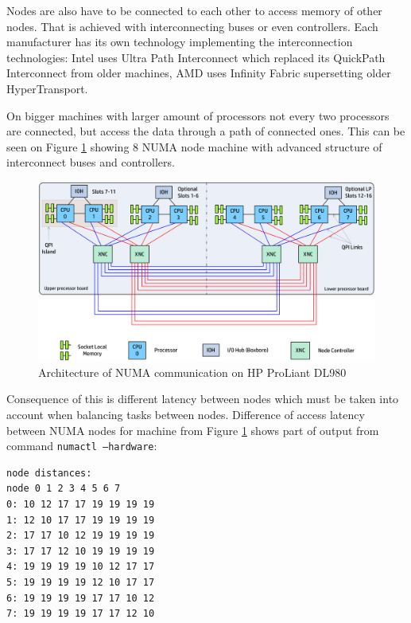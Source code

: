 Nodes are also have to be connected to each other to access memory of other
nodes. That is achieved with interconnecting buses or even controllers. Each
manufacturer has its own technology implementing the interconnection
technologies: Intel uses Ultra Path Interconnect which replaced its QuickPath
Interconnect from older machines, AMD uses Infinity Fabric supersetting older
HyperTransport.

On bigger machines with larger amount of processors not every two processors are
connected, but access the data through a path of connected ones. This can be
seen on Figure \ref{fig:proliant} showing 8 NUMA node machine with advanced
structure of interconnect buses and controllers.

\begin{figure}
  \centering
  \includegraphics[width=14cm]{obrazky-figures/proliant}
  \caption{Architecture of NUMA communication on HP ProLiant DL980}
  \label{fig:proliant}
\end{figure}

Consequence of this is different latency between nodes which must be taken into
account when balancing tasks between nodes. Difference of access latency between
NUMA nodes for machine from Figure \ref{fig:proliant} shows part of output from
command \texttt{numactl --hardware}:

\begin{minipage}{\linewidth}
\begin{verbatim}
node distances:
node 0 1 2 3 4 5 6 7
0: 10 12 17 17 19 19 19 19
1: 12 10 17 17 19 19 19 19
2: 17 17 10 12 19 19 19 19
3: 17 17 12 10 19 19 19 19
4: 19 19 19 19 10 12 17 17
5: 19 19 19 19 12 10 17 17
6: 19 19 19 19 17 17 10 12
7: 19 19 19 19 17 17 12 10
\end{verbatim}
\end{minipage}\\

